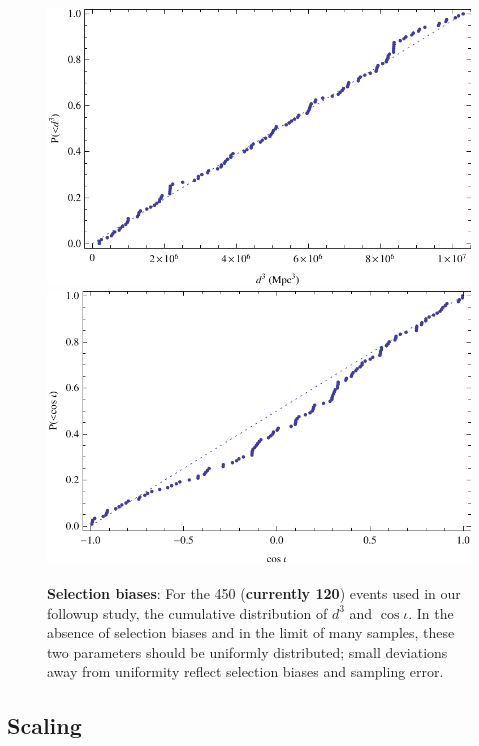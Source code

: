 \begin{figure}
\includegraphics[width=\columnwidth]{../Figures/fig-mma-manual-2015MDC-SelectedEvents-DistanceCumulative}
\includegraphics[width=\columnwidth]{../Figures/fig-mma-manual-2015MDC-SelectedEvents-CosIotaCumulative}
\caption{\label{fig:SearchSelection}\textbf{Selection biases}: For the 450 (\textbf{currently 120}) events used in our followup study, the cumulative distribution of $d^3$
  and $\cos \iota$.  In the absence of selection biases and in the limit of many samples, these two parameters should be
  uniformly distributed; small deviations away from uniformity reflect selection biases and sampling error.
}
\end{figure}


\subsection{Scaling}


